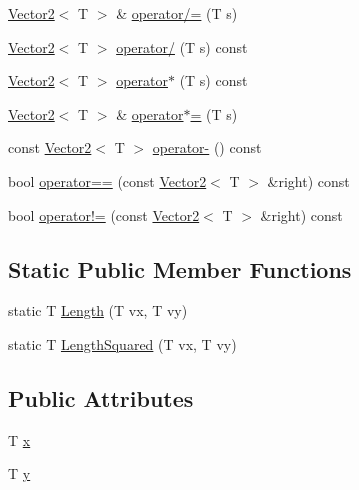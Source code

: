 \begin{DoxyCompactItemize}
\item 
\hyperlink{classastu_1_1Vector2}{Vector2}$<$ T $>$ \& \hyperlink{classastu_1_1Vector2_a9f9362218a0d011032324cbc7a9a85a1}{operator/=} (T s)
\item 
\hyperlink{classastu_1_1Vector2}{Vector2}$<$ T $>$ \hyperlink{classastu_1_1Vector2_af2852a5bb5295f1a510e507bc554863d}{operator/} (T s) const
\item 
\hyperlink{classastu_1_1Vector2}{Vector2}$<$ T $>$ \hyperlink{classastu_1_1Vector2_aa9cd4d74e0174cb0995613f989e42f12}{operator$\ast$} (T s) const
\item 
\hyperlink{classastu_1_1Vector2}{Vector2}$<$ T $>$ \& \hyperlink{classastu_1_1Vector2_a3a4e11dd85fbd0e1cda4e8b38b9aea6a}{operator$\ast$=} (T s)
\item 
const \hyperlink{classastu_1_1Vector2}{Vector2}$<$ T $>$ \hyperlink{classastu_1_1Vector2_aaa65baf8ffd013a0401c4875d91337a4}{operator-\/} () const
\item 
bool \hyperlink{classastu_1_1Vector2_ada7f1d693330e7671cb1f951d8011c08}{operator==} (const \hyperlink{classastu_1_1Vector2}{Vector2}$<$ T $>$ \&right) const
\item 
bool \hyperlink{classastu_1_1Vector2_a01b57021e1b027997ecefb3c9b3595d9}{operator!=} (const \hyperlink{classastu_1_1Vector2}{Vector2}$<$ T $>$ \&right) const
\end{DoxyCompactItemize}
\subsection*{Static Public Member Functions}
\begin{DoxyCompactItemize}
\item 
static T \hyperlink{classastu_1_1Vector2_a7fdf839b6c3444121dc6fb2eb88c200e}{Length} (T vx, T vy)
\item 
static T \hyperlink{classastu_1_1Vector2_afbc3ba40ff99e66abbe5db6b5adb6b97}{Length\+Squared} (T vx, T vy)
\end{DoxyCompactItemize}
\subsection*{Public Attributes}
\begin{DoxyCompactItemize}
\item 
T \hyperlink{classastu_1_1Vector2_aa60c30b27742255fbe7053b07a7e76ba}{x}
\item 
T \hyperlink{classastu_1_1Vector2_a6718f5a7005c38830dbd31283a87f5c9}{y}
\end{DoxyCompactItemize}


